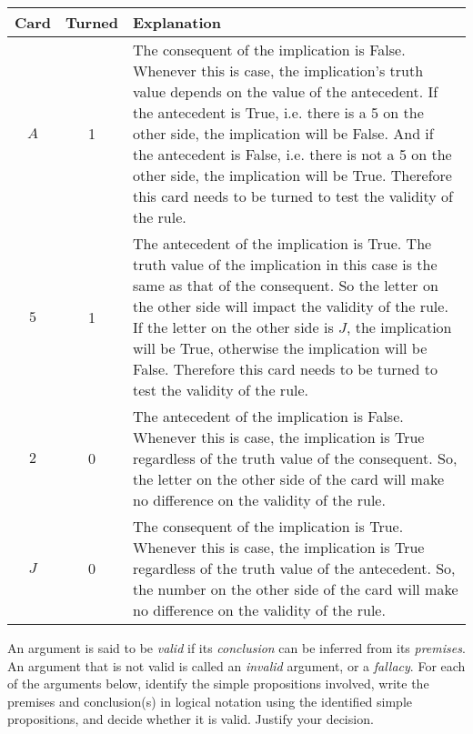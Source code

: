 \documentclass[addpoints]{exam}
\begin{document}
\begin{questions}
\begin{solution}
    \begin{tabularx}{\textwidth}{c|c|X}
      Card & Turned & Explanation \\\hline\hline
      $A$ & 1 & The consequent of the implication is False. Whenever this is case, the implication's truth value depends on the value of the antecedent. If the antecedent is True, i.e. there is a 5 on the other side, the implication will be False. And if the antecedent is False, i.e. there is not a 5 on the other side, the implication will be True. Therefore this card needs to be turned to test the validity of the rule.\\\hline
      $5$ & 1 & The antecedent of the implication is True. The truth value of the implication in this case is the same as that of the consequent. So the letter on the other side will impact the validity of the rule. If the letter on the other side is $J$, the implication will be True, otherwise the implication will be False. Therefore this card needs to be turned to test the validity of the rule.\\\hline
      $2$ & 0 & The antecedent of the implication is False. Whenever this is case, the implication is True regardless of the truth value of the consequent. So, the letter on the other side of the card will make no difference on the validity of the rule.\\\hline
      $J$ & 0 & The consequent of the implication is True. Whenever this is case, the implication is True regardless of the truth value of the antecedent. So, the number on the other side of the card will make no difference on the validity of the rule.
    \end{tabularx}
  \end{solution}
  
\question An argument is said to be \textit{valid} if its \textit{conclusion} can be inferred from its \textit{premises}. An argument that is not valid is called an \textit{invalid} argument, or a \textit{fallacy}. For each of the arguments below, identify the simple propositions involved, write the premises and conclusion(s) in logical notation using the identified simple propositions, and decide whether it is valid. Justify your decision.
\end{questions}
\end{document}
